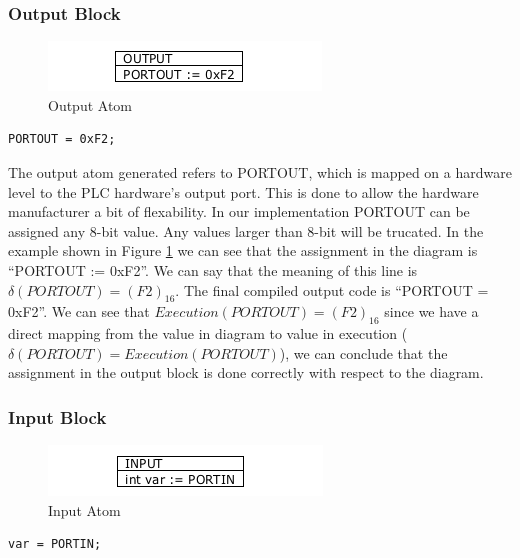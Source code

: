 \subsubsection{Output Block}

\begin{figure}[h]
	\centering
	\includegraphics[width=\imgmedphoto]{./images/correctness_atom_output.png}
	\caption{Output Atom}
	\label{fig:correctness_atom_output}
\end{figure}

\begin{lstlisting}[frame=single]
PORTOUT = 0xF2;
\end{lstlisting}

The output atom generated refers to PORTOUT, which is mapped on a hardware level 
to the PLC hardware's output port. This is done to allow the hardware manufacturer 
a bit of flexability. In our implementation PORTOUT can be assigned any 8-bit value. 
Any values larger than 8-bit will be trucated. 
In the example shown in Figure \ref{fig:correctness_atom_output} we can see that the 
assignment in the diagram is ``PORTOUT := 0xF2''. We can say that the meaning of 
this line is $\delta(PORTOUT) = (F2)_{16}$. The final compiled output code is 
``PORTOUT = 0xF2''. We can see that $Execution(PORTOUT) = (F2)_{16}$ since we 
have a direct mapping from the value in diagram to value in 
execution ($\delta(PORTOUT) = Execution(PORTOUT)$), we can conclude that 
the assignment in the output block is done correctly with respect to the diagram.

\clearpage
\subsubsection{Input Block}

\begin{figure}[h]
	\centering
	\includegraphics[width=\imgmedphoto]{./images/correctness_atom_input.png}
	\caption{Input Atom}
	\label{fig:correctness_atom_input}
\end{figure}

\begin{lstlisting}[frame=single]
var = PORTIN;
\end{lstlisting}


